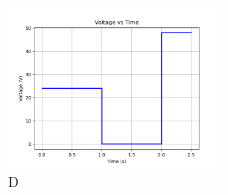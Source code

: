     \begin{figure}[h!]
    \centering
      \hspace{-1cm}
      \includegraphics[width=0.5\textwidth]{figs/Figure_5.png}
      \caption{D}
      \label{fig:your_label}
    \end{figure}

    
    


   
   

